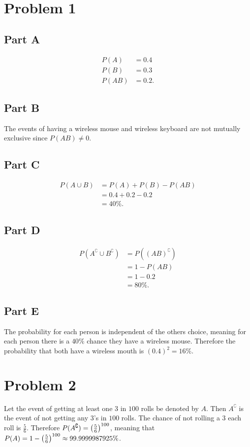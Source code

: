 \documentclass[12pt]{extarticle}
\begin{document}
\section*{Problem 1}
\subsection*{Part A}
\begin{align*}
	P(A) &= 0.4 \\
	P(B) &= 0.3 \\
	P(AB) &= 0.2
.\end{align*}

\subsection*{Part B}
The events of having a wireless mouse and wireless keyboard are not mutually exclusive since $P(AB) \neq 0$.

\subsection*{Part C}
\begin{align*}
	P(A \cup B) &= P(A) + P(B) - P(AB) \\
	&= 0.4 + 0.2 - 0.2 \\
	&= 40\%
.\end{align*}

\subsection*{Part D}
\begin{align*}
	P(A^\complement \cup B^\complement) &= P((AB)^\complement) \\
	&= 1 - P(AB) \\
	&= 1 - 0.2 \\
	&= 80\%
.\end{align*}

\subsection*{Part E}
The probability for each person is independent of the others choice, meaning for each person there is a $40\%$ chance they have a wireless mouse. Therefore the probability that both have a wireless mouth is $(0.4)^2 = 16\%$.

\section*{Problem 2}
Let the event of getting at least one $3$ in $100$ rolls be denoted by $A$. Then $A^\complement$ is the event of not getting any $3$'s in $100$ rolls. The chance of not rolling a $3$ each roll is $\frac{5}{6}$. Therefore $P(A^\complement) = \qty(\frac{5}{6})^{100}$, meaning that $P(A) = 1 - \qty(\frac{5}{6})^{100} \approx 99.9999987925\%$.
\end{document}
